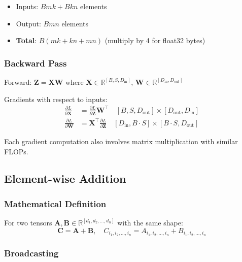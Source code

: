 \documentclass[10pt]{article}
\begin{document}
\begin{itemize}
  \item Inputs: $Bmk + Bkn$ elements
  \item Output: $Bmn$ elements
  \item \textbf{Total}: $B(mk + kn + mn)$ (multiply by 4 for float32 bytes)
\end{itemize}

\subsubsection{Backward Pass}

Forward: $\mathbf{Z} = \mathbf{X}\mathbf{W}$ where $\mathbf{X} \in \mathbb{R}^{[B,S,D_{\text{in}}]}$, $\mathbf{W} \in \mathbb{R}^{[D_{\text{in}},D_{\text{out}}]}$

Gradients with respect to inputs:
\begin{align}
\frac{\partial L}{\partial \mathbf{X}} &= \frac{\partial L}{\partial \mathbf{Z}} \mathbf{W}^{\top} \quad [B,S,D_{\text{out}}] \times [D_{\text{out}},D_{\text{in}}] \\
\frac{\partial L}{\partial \mathbf{W}} &= \mathbf{X}^{\top} \frac{\partial L}{\partial \mathbf{Z}} \quad [D_{\text{in}},B \cdot S] \times [B \cdot S,D_{\text{out}}]
\end{align}

Each gradient computation also involves matrix multiplication with similar FLOPs.

\subsection{Element-wise Addition}
\label{subsec:add}

\subsubsection{Mathematical Definition}

For two tensors $\mathbf{A}, \mathbf{B} \in \mathbb{R}^{[d_1, d_2, \ldots, d_n]}$ with the same shape:
\begin{equation}
\mathbf{C} = \mathbf{A} + \mathbf{B}, \quad C_{i_1, i_2, \ldots, i_n} = A_{i_1, i_2, \ldots, i_n} + B_{i_1, i_2, \ldots, i_n}
\end{equation}

\subsubsection{Broadcasting}
\end{document}
